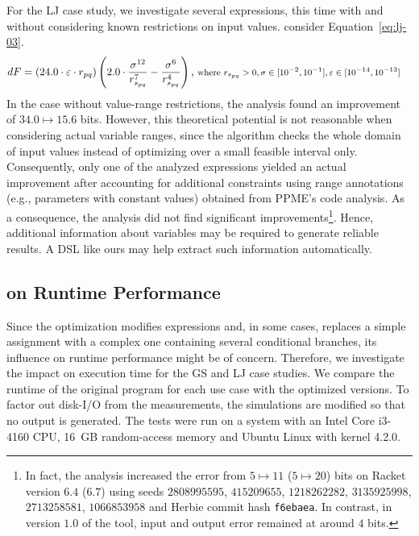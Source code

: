 For the LJ case study, we investigate several expressions, this time with and 
without considering known restrictions on input values.  consider 
Equation~\ref{eq:lj-03}.
%
\begin{align}\label{eq:lj-03}
	dF &= (24.0 \cdot \varepsilon \cdot r_{pq}) \left(2.0 \cdot \frac{\sigma^{12}}{r_{s_{pq}}^{7}} - \frac{\sigma^{6}}{r_{s_{pq}}^{4}}\right)
 \text{, \footnotesize where $r_{s_{pq}} > 0, \sigma \in [10^{-2}, 10^{-1}], \varepsilon \in [10^{-14}, 10^{-13}]$} 
\end{align}
%
In the case without value-range restrictions, the analysis found an improvement of 
${34.0}\mapsto{15.6}$ bits. However, this theoretical potential is
not reasonable when considering actual variable ranges, since the algorithm checks 
the whole domain of input values instead of optimizing over a small feasible interval only.
Consequently, only one of the analyzed expressions yielded 
an actual improvement after accounting for additional constraints using range annotations
(e.g., parameters with constant values) obtained from PPME's code analysis. 
As a consequence, the analysis did not find significant
improvements\footnote{In fact, the analysis increased the error from $5\mapsto{11}$ ($5\mapsto{20}$) bits 
on Racket version $6.4$ ($6.7$) using seeds $2808995595$, $415209655$, $1218262282$, $3135925998$, $2713258581$,
$1066853958$ and Herbie commit hash \texttt{f6ebaea}. In contrast, in version $1.0$ of the tool, input and output error
remained at around $4$ bits.}. 
Hence, additional information about variables may be required to generate reliable results. A DSL like ours
may help extract such information automatically.  

\subsection{ on Runtime Performance}
\label{par:influence_on_runtime_performance}
Since the optimization modifies expressions and, in some cases, replaces a simple assignment
with a complex one containing several conditional branches, its influence on runtime
performance might be of concern. Therefore, we investigate the impact on execution time 
for the GS and LJ case studies. We compare the runtime of
the original program for each use case with the optimized versions. To factor out 
disk-I/O from the measurements, the
simulations are modified so that no output is generated. The tests
were run on a system with an Intel Core i3-4160 CPU, 16~GB random-access memory 
and Ubuntu Linux with kernel 4.2.0.

